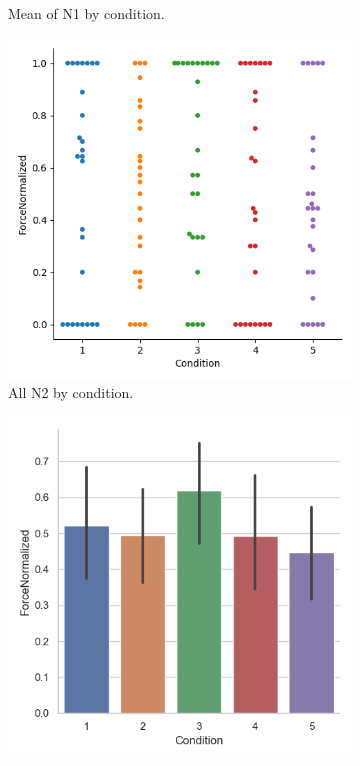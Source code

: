 \begin{figure}[H]
\begin{subfigure}[b]{0.4\textwidth}
         \caption{Mean of N1  by condition. }
         \label{fig:allForceNCond}
     \end{subfigure} 
     \hspace*{\fill}
         \begin{subfigure}[b]{0.4\textwidth}
         \centering
         \includegraphics[width=\textwidth]{Files/Plots/forceNormalized_by_cond_swarm.png}
         \caption{All N2 by condition.}
         \label{fig:allForceNorm}
     \end{subfigure}
\hspace*{\fill}
     \begin{subfigure}[b]{0.4\textwidth}
         \centering
         \includegraphics[width=\textwidth]{Files/Plots/forceNormalized_mean_by_condition.png}

\end{subfigure}
\end{figure}
